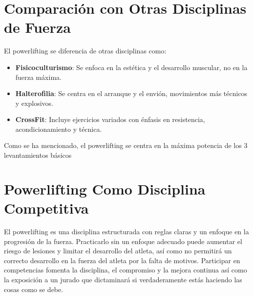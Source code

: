 \documentclass{article}
\begin{document}
\section{Comparación con Otras Disciplinas de Fuerza}

El powerlifting se diferencia de otras disciplinas como:
\begin{itemize}
    \item \textbf{Fisicoculturismo}: Se enfoca en la estética y el desarrollo muscular, no en la fuerza máxima.
    \item \textbf{Halterofilia}: Se centra en el arranque y el envión, movimientos más técnicos y explosivos.
    \item \textbf{CrossFit}: Incluye ejercicios variados con énfasis en resistencia, acondicionamiento y técnica.
\end{itemize}
Como se ha mencionado, el powerlifting se centra en la máxima potencia de los 3 levantamientos básicos

\section{Powerlifting Como Disciplina Competitiva}

El powerlifting es una disciplina estructurada con reglas claras y un enfoque en la progresión de la fuerza. Practicarlo sin un enfoque adecuado puede aumentar el riesgo de lesiones y limitar el desarrollo del atleta, así como no permitirá un correcto desarrollo en la fuerza del atleta por la falta de motivos. Participar en competencias fomenta la disciplina, el compromiso y la mejora continua así como la exposición a un jurado que dictaminará si verdaderamente estás haciendo las cosas como se debe.
\end{document}
